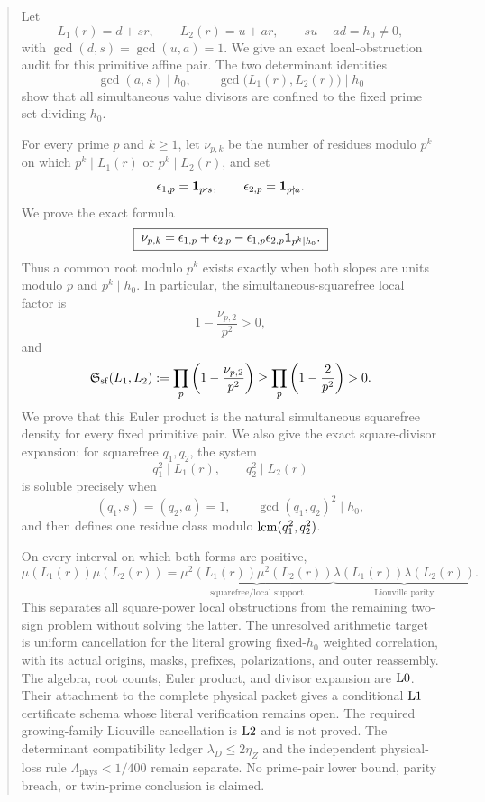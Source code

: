 \begin{abstract}
Let
\[
 L_1(r)=d+sr,\qquad L_2(r)=u+ar,
 \qquad su-ad=h_0\ne0,
\]
with \(\gcd(d,s)=\gcd(u,a)=1\).  We give an exact local-obstruction
audit for this primitive affine pair.  The two determinant identities
\[
 \gcd(a,s)\mid h_0,\qquad
 \gcd\bigl(L_1(r),L_2(r)\bigr)\mid h_0
\]
show that all simultaneous value divisors are confined to the fixed
prime set dividing \(h_0\).

For every prime \(p\) and \(k\ge1\), let \(\nu_{p,k}\) be the number
of residues modulo \(p^k\) on which \(p^k\mid L_1(r)\) or
\(p^k\mid L_2(r)\), and set
\[
 \epsilon_{1,p}=\ind_{p\nmid s},\qquad
 \epsilon_{2,p}=\ind_{p\nmid a}.
\]
We prove the exact formula
\[
 \boxed{\;
 \nu_{p,k}
 =\epsilon_{1,p}+\epsilon_{2,p}
 -\epsilon_{1,p}\epsilon_{2,p}\ind_{p^k\mid h_0}.
 \;}
\]
Thus a common root modulo \(p^k\) exists exactly when both slopes are
units modulo \(p\) and \(p^k\mid h_0\).  In particular, the
simultaneous-squarefree local factor is
\[
 1-\frac{\nu_{p,2}}{p^2}>0,
\]
and
\[
 \Mloc(L_1,L_2)
 :=\prod_p\left(1-\frac{\nu_{p,2}}{p^2}\right)
 \ge\prod_p\left(1-\frac{2}{p^2}\right)>0.
\]
We prove that this Euler product is the natural simultaneous
squarefree density for every fixed primitive pair.  We also give the
exact square-divisor expansion: for squarefree \(q_1,q_2\), the system
\[
 q_1^2\mid L_1(r),\qquad q_2^2\mid L_2(r)
\]
is soluble precisely when
\[
 (q_1,s)=(q_2,a)=1,\qquad
 \gcd(q_1,q_2)^2\mid h_0,
\]
and then defines one residue class modulo
\(\lcm(q_1^2,q_2^2)\).

On every interval on which both forms are positive,
\[
 \mu(L_1(r))\mu(L_2(r))
 =
 \underbrace{\mu^2(L_1(r))\mu^2(L_2(r))}_{\text{squarefree/local support}}
 \underbrace{\lambda(L_1(r))\lambda(L_2(r))}_{\text{Liouville parity}}.
\]
This separates all square-power local obstructions from the remaining
two-sign problem without solving the latter.  The unresolved
arithmetic target is uniform cancellation for the literal growing
fixed-\(h_0\) weighted correlation, with its actual origins, masks,
prefixes, polarizations, and outer reassembly.  The algebra, root
counts, Euler product, and divisor expansion are \(\Lzero\).  Their
attachment to the complete physical packet gives a conditional
\(\Lone\) certificate schema whose literal verification remains
open.  The required growing-family Liouville cancellation is
\(\Ltwo\) and is not proved.  The determinant compatibility ledger
\(\lambda_D\le2\eta_Z\) and the independent physical-loss rule
\(\Lambda_{\mathrm{phys}}<1/400\) remain separate.  No prime-pair
lower bound, parity breach, or twin-prime conclusion is claimed.
\end{abstract}
